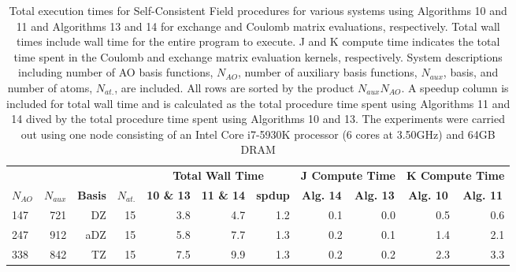 \begingroup
\renewcommand{\arraystretch}{0.6}
\begin{table}[H]
\footnotesize
\centering
\renewcommand{\baselinestretch}{1}
\caption{Total execution times for Self-Consistent Field procedures for various systems using Algorithms 10 and 11 and Algorithms 13 and 14 for
exchange and Coulomb matrix evaluations, respectively. Total wall times include 
wall time for the entire program to execute. J and K compute time indicates the total time spent in the Coulomb and exchange matrix
evaluation kernels, respectively. System descriptions including number of AO basis functions, $N_{AO}$, number of auxiliary basis functions,
$N_{aux}$, basis, and number of atoms, $N_{at.}$, are included. All rows are sorted by the product $N_{aux}N_{AO}$.
A speedup column is included for total wall time and is calculated as the total procedure time spent using Algorithms 11 and 14 dived by 
the total procedure time spent using Algorithms 10 and 13. The experiments were carried out using one node consisting of an Intel Core i7-5930K processor
(6 cores at 3.50GHz) and 64GB DRAM
\label{tbl:practical_speedups}}
\begin{tabular}{lrrrrrrrrrr}
  \multicolumn{1}{c}{\textbf{}} 
& \multicolumn{1}{c}{\textbf{}} 
& \multicolumn{1}{c}{\textbf{}} 
& \multicolumn{1}{c}{\textbf{}} 
& \multicolumn{3}{c}{\textbf{Total Wall Time}}  
& \multicolumn{2}{c}{\textbf{J Compute Time}}  
& \multicolumn{2}{c}{\textbf{K Compute Time}} \\ 
\cline{5-7}
\cline{8-9}
\cline{10-11}
  \multicolumn{1}{c}{\textbf{$N_{AO}$}} 
& \multicolumn{1}{c}{\textbf{$N_{aux}$}} 
& \multicolumn{1}{c}{\textbf{Basis}} 
& \multicolumn{1}{c}{\textbf{$N_{at.}$}} 
& \multicolumn{1}{c}{\textbf{10 \& 13}} 
& \multicolumn{1}{c}{\textbf{11 \& 14}} 
& \multicolumn{1}{c}{\textbf{spdup}} 
& \multicolumn{1}{c}{\textbf{Alg. 14}} 
& \multicolumn{1}{c}{\textbf{Alg. 13}} 
& \multicolumn{1}{c}{\textbf{Alg. 10}} 
& \multicolumn{1}{c}{\textbf{Alg. 11}} \\ 
\hline
 147&  721&    DZ&    15&                 3.8 &                4.7&     1.2 &                0.1 &                0.0&                 0.5&                 0.6\\
 247&  912&   aDZ&    15&                 5.8 &                7.7&     1.3 &                0.2 &                0.1&                 1.4&                 2.1\\
 338&  842&    TZ&    15&                 7.5 &                9.9&     1.3 &                0.2 &                0.2&                 2.3&                 3.3\\

\end{tabular}
\end{table}

